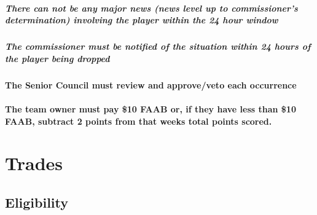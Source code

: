 \documentclass[
]{book}
\begin{document}
\hypertarget{there-can-not-be-any-major-news-news-level-up-to-commissioners-determination-involving-the-player-within-the-24-hour-window}{%
\paragraph{There can not be any major news (news level up to commissioner's determination) involving the player within the 24 hour window}\label{there-can-not-be-any-major-news-news-level-up-to-commissioners-determination-involving-the-player-within-the-24-hour-window}}

\hypertarget{the-commissioner-must-be-notified-of-the-situation-within-24-hours-of-the-player-being-dropped}{%
\paragraph{The commissioner must be notified of the situation within 24 hours of the player being dropped}\label{the-commissioner-must-be-notified-of-the-situation-within-24-hours-of-the-player-being-dropped}}

\hypertarget{the-senior-council-must-review-and-approveveto-each-occurrence}{%
\subsubsection{The Senior Council must review and approve/veto each occurrence}\label{the-senior-council-must-review-and-approveveto-each-occurrence}}

\hypertarget{the-team-owner-must-pay-10-faab-or-if-they-have-less-than-10-faab-subtract-2-points-from-that-weeks-total-points-scored.}{%
\subsubsection{The team owner must pay \$10 FAAB or, if they have less than \$10 FAAB, subtract 2 points from that weeks total points scored.}\label{the-team-owner-must-pay-10-faab-or-if-they-have-less-than-10-faab-subtract-2-points-from-that-weeks-total-points-scored.}}

\hypertarget{trades}{%
\chapter{Trades}\label{trades}}

\hypertarget{eligibility}{%
\section{Eligibility}\label{eligibility}}
\end{document}
